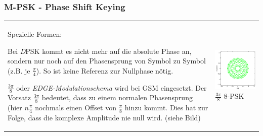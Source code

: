\subsubsection{M-PSK - Phase Shift Keying }
\begin{tabular}{ll}
\parbox{10cm}{
Spezielle Formen:\\
\begin{liste}
 \item Bei \textit{D}PSK kommt es nicht mehr auf die
	absolute Phase an, sondern nur noch auf den Phasensprung von Symbol zu Symbol
	(z.B. je $\frac{\pi}{4}$). So ist keine Referenz zur Nullphase nötig.
 \item \textit{$\frac{3\pi}{8}$} oder \textit{EDGE-Modulationschema} wird bei
 GSM eingesetzt. Der Vorsatz \textit{$\frac{3\pi}{8}$} bedeutet, dass zu
 einem normalen Phasensprung (hier $n \frac{\pi}{4}$ nochmals einen Offset
 von $\frac{\pi}{8}$ hinzu kommt. Dies hat zur Folge, dass die komplexe
 Amplitude nie null wird. (siehe Bild)
\end{liste}


}
&\parbox{6cm}{
    \includegraphics[width=6cm]{./bilder/modulation_constellationEDGE.png}\\
    $\frac{3 \pi}{8}$ 8-PSK

}
\end{tabular}

